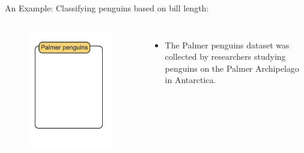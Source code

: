 \documentclass[8pt,dvipsnames]{beamer}
\begin{document}
\begin{frame}{An Example: Classifying penguins based on bill length:}
	\begin{columns}
		\begin{figure}
			\centering
			\includegraphics[width=\textwidth]{imgs/knn_1.png}
		\end{figure}
		\begin{itemize}
			\item The Palmer penguins dataset was collected by researchers studying penguins on the Palmer Archipelago in Antarctica.
		\end{itemize}
	\end{columns}
\end{frame}
\end{document}
